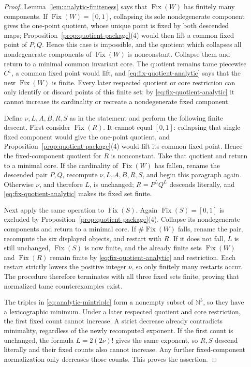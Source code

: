 \documentclass[11pt]{article}
\theoremstyle{definition}
\theoremstyle{remark}
\newcommand{\I}{[0,1]}
\newcommand{\Fix}{\operatorname{Fix}}
\begin{document}
\begin{proof}
Lemma~\ref{lem:analytic-finiteness} says that \(\Fix(W)\) has finitely many
components.  If \(\Fix(W)=\I\), collapsing its sole nondegenerate component
gives the one-point quotient, whose unique point is fixed by both descended
maps; Proposition~\ref{prop:quotient-package}(4) would then lift a common
fixed point of \(P,Q\).  Hence this case is impossible, and the quotient
which collapses all nondegenerate components of \(\Fix(W)\) is nonconstant.
Collapse them and return to a minimal common invariant core.  The quotient
remains tame piecewise \(C^1\), a common fixed point would lift, and
\eqref{eq:fix-quotient-analytic} says that the new \(\Fix(W)\) is finite.
Every later respected quotient or core
restriction can only identify or discard points of this finite set: by
\eqref{eq:fix-quotient-analytic} it cannot increase its cardinality or
recreate a nondegenerate fixed component.

Define \(\nu,L,A,B,R,S\) as in the statement and perform the following
finite descent.  First consider \(\Fix(R)\).  It cannot equal \(\I\):
collapsing that single fixed component would give the one-point quotient,
and Proposition~\ref{prop:quotient-package}(4) would lift its common fixed
point.  Hence the fixed-component quotient for \(R\) is nonconstant.  Take
that quotient and return to a minimal core.  If the cardinality of
\(\Fix(W)\) has fallen, rename the descended pair \(P,Q\), recompute
\(\nu,L,A,B,R,S\), and begin this paragraph again.  Otherwise \(\nu\), and
therefore \(L\), is unchanged; \(R=P^LQ^L\) descends literally, and
\eqref{eq:fix-quotient-analytic} makes its fixed set finite.

Next apply the same operation to \(\Fix(S)\).  Again \(\Fix(S)=\I\) is
excluded by Proposition~\ref{prop:quotient-package}(4).  Collapse its
nondegenerate components and return to a minimal core.  If
\(\#\Fix(W)\) falls, rename the pair, recompute the six displayed objects,
and restart with \(R\).  If it does not fall, \(L\) is still unchanged,
\(\Fix(S)\) is now finite, and the already finite sets \(\Fix(W)\) and
\(\Fix(R)\) remain finite by
\eqref{eq:fix-quotient-analytic} and restriction.  Each restart strictly
lowers the positive integer \(\nu\), so only finitely many restarts occur.
The procedure therefore terminates with all three fixed sets finite, proving
that normalized tame counterexamples exist.

The triples in \eqref{eq:analytic-mintriple} form a nonempty subset of
\(\mathbb N^3\), so they have a lexicographic minimum.  Under a later
respected quotient and core restriction, the first fixed count cannot
increase.  A strict decrease already contradicts minimality, regardless of
the newly recomputed exponent.  If the first count is unchanged, the formula
\(L=2(2\nu)!\) gives the same exponent, so \(R,S\) descend literally and
their fixed counts also cannot increase.  Any further fixed-component
normalization only decreases those counts.  This proves the assertion.
\end{proof}
\end{document}
